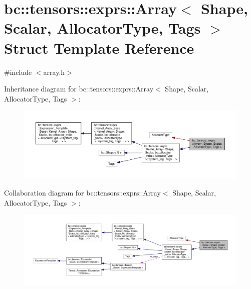 \hypertarget{structbc_1_1tensors_1_1exprs_1_1Array}{}\section{bc\+:\+:tensors\+:\+:exprs\+:\+:Array$<$ Shape, Scalar, Allocator\+Type, Tags $>$ Struct Template Reference}
\label{structbc_1_1tensors_1_1exprs_1_1Array}


{\ttfamily \#include $<$array.\+h$>$}



Inheritance diagram for bc\+:\+:tensors\+:\+:exprs\+:\+:Array$<$ Shape, Scalar, Allocator\+Type, Tags $>$\+:\nopagebreak
\begin{figure}[H]
\begin{center}
\leavevmode
\includegraphics[width=350pt]{structbc_1_1tensors_1_1exprs_1_1Array__inherit__graph}
\end{center}
\end{figure}


Collaboration diagram for bc\+:\+:tensors\+:\+:exprs\+:\+:Array$<$ Shape, Scalar, Allocator\+Type, Tags $>$\+:\nopagebreak
\begin{figure}[H]
\begin{center}
\leavevmode
\includegraphics[width=350pt]{structbc_1_1tensors_1_1exprs_1_1Array__coll__graph}
\end{center}
\end{figure}
